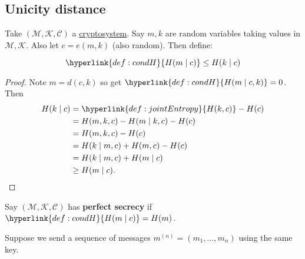 \documentclass{article}
\newcommand{\1}[1]{\mathbbm{1}_{#1}}
\begin{document}
\subsection{Unicity distance}
Take $(\mathcal{M}, \mathcal{K}, \mathcal{C})$ a \hyperlink{def:cryptosystem}{cryptosystem}.
Say $m,k$ are random variables taking values in \hyperlink{def:text}{$\mathcal{M},\mathcal{K}$}.
Also let $c = e(m, k)$ (also random). Then define:
\begin{nlemma}\label{lem:3.1}
    \begin{equation*}
        \hyperlink{def:condH}{H(m \mid c)} \leq H(k \mid c)
    \end{equation*}
\end{nlemma}
\begin{proof}
    Note $m = d(c, k)$ so get $\hyperlink{def:condH}{H(m \mid  c,k)} = 0$. Then
    \begin{align*}
        H(k \mid  c) &= \hyperlink{def:jointEntropy}{H(k,c)} - H(c) \\
                 &= H(m,k,c)-H(m\mid k,c) - H(c) \\
                 &= H(m,k,c)-H(c) \\
                 &= H(k\mid m,c)+H(m,c)-H(c) \\
                 &= H(k\mid m,c) + H(m\mid c) \\
                 &\geq H(m \mid  c). \qedhere
    \end{align*}
\end{proof}
\begin{remark}
    Say $(\mathcal{M}, \mathcal{K}, \mathcal{C})$ has \textbf{perfect secrecy} if $\hyperlink{def:condH}{H(m\mid c)} = H(m)$.
\end{remark}
Suppose we send a sequence of messages $m^{(n)} = (m_1, \dotsc, m_n)$ using the same key.
\end{document}
